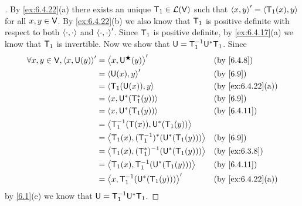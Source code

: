 \begin{proof}[]
  By \cref{ex:6.4.22}(a) there exists an unique \(\mathsf{T}_1 \in \mathcal{L}(\mathsf{V})\) such that \(\left\langle x, y\right\rangle' = \left\langle\mathsf{T}_1(x), y\right\rangle\) for all \(x, y \in \mathsf{V}\).
  By \cref{ex:6.4.22}(b) we also know that \(\mathsf{T}_1\) is positive definite with respect to both \(\left\langle\cdot, \cdot\right\rangle\) and \(\left\langle\cdot, \cdot\right\rangle'\).
  Since \(\mathsf{T}_1\) is positive definite, by \cref{ex:6.4.17}(a) we know that \(\mathsf{T}_1\) is invertible.
  Now we show that \(\mathsf{U} = \mathsf{T}_1^{-1} \mathsf{U}^* \mathsf{T}_1\).
  Since
  \begin{align*}
    \forall x, y \in \V, \inn{x, \U(y)}' & = \inn{x, \U^{\bigstar}(y)}'                  &  & \by{6.4.8}        \\
                                         & = \inn{\U(x), y}'                             &  & \by{6.9}          \\
                                         & = \inn{\T_1(\U(x)), y}                        &  & \by{ex:6.4.22}[a] \\
                                         & = \inn{x, \U^*(\T_1^*(y))}                    &  & \by{6.9}          \\
                                         & = \inn{x, \U^*(\T_1(y))}                      &  & \by{6.4.11}       \\
                                         & = \inn{\T_1^{-1}(\T(x)), \U^*(\T_1(y))}                              \\
                                         & = \inn{\T_1(x), (\T_1^{-1})^*(\U^*(\T_1(y)))} &  & \by{6.9}          \\
                                         & = \inn{\T_1(x), (\T_1^*)^{-1}(\U^*(\T_1(y)))} &  & \by{ex:6.3.8}     \\
                                         & = \inn{\T_1(x), \T_1^{-1}(\U^*(\T_1(y)))}     &  & \by{6.4.11}       \\
                                         & = \inn{x, \T_1^{-1}(\U^*(\T_1(y)))}'          &  & \by{ex:6.4.22}[a]
  \end{align*}
  by \cref{6.1}(e) we know that \(\mathsf{U} = \mathsf{T}_1^{-1} \mathsf{U}^* \mathsf{T}_1\).


\end{proof}
